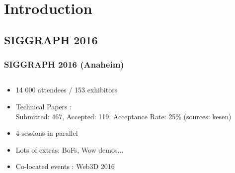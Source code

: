 \section{Introduction}
\subsection{SIGGRAPH 2016}
\frame
{
	\frametitle{SIGGRAPH 2016 (Anaheim)}
	\begin{minipage}[0.2\textheight]{\textwidth}
		\begin{columns}[T]
			\begin{column}{0.6\textwidth}
				\begin{itemize}
					\item 14 000 attendees / 153 exhibitors 
					\item Technical Papers :\\ Submitted: 467, Accepted: 119, Acceptance Rate: 25\% (sources: kesen)
					\item 4 sessions in parallel
					\item Lots of extras: BoFs, Wow demos...
					\item Co-located events : Web3D 2016 
				\end{itemize}
				

\end{column}
\end{columns}
\end{minipage}}
